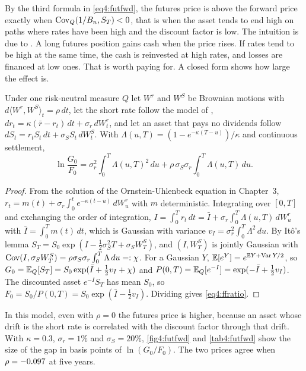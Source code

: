\begin{chapterrefs}
By the third formula in \cref{eq4:futfwd}, the futures price is above the forward price exactly when
$\operatorname{Cov}_Q(1/B_n,S_T)<0$, that is when the asset tends to end high on paths where rates have been high and
the discount factor is low. The intuition is due to \textcite{cox1981}. A long futures position gains
cash when the price rises. If rates tend to be high at the same time, the cash is reinvested at high
rates, and losses are financed at low ones. That is worth paying for. A closed form shows how large
the effect is.

\begin{proposition}\label{prop4:vasicek}
Under one risk-neutral measure $Q$ let $W^r$ and $W^S$ be Brownian motions with
$d\langle W^r,W^S\rangle_t=\rho\,dt$, let the short rate follow the model of \textcite{vasicek1977},
$dr_t=\kappa(\bar r-r_t)\,dt+\sigma_r\,dW^r_t$, and let an asset that pays no dividends follow
$dS_t=r_tS_t\,dt+\sigma_SS_t\,dW^S_t$. With $\Lambda(u,T)=(1-e^{-\kappa(T-u)})/\kappa$ and continuous
settlement,
\begin{equation}\label{eq4:ffratio}
  \ln\frac{G_0}{F_0}=\sigma_r^2\int_0^T\Lambda(u,T)^2\,du+\rho\,\sigma_S\sigma_r\int_0^T\Lambda(u,T)\,du .
\end{equation}
\end{proposition}

\begin{proof}
From the solution of the Ornstein-Uhlenbeck equation in Chapter~3,
$r_t=m(t)+\sigma_r\int_0^te^{-\kappa(t-u)}\,dW^r_u$ with $m$ deterministic. Integrating over
$[0,T]$ and exchanging the order of integration,
$I=\int_0^Tr_t\,dt=\bar I+\sigma_r\int_0^T\Lambda(u,T)\,dW^r_u$ with $\bar I=\int_0^Tm(t)\,dt$, which is
Gaussian with variance $v_I=\sigma_r^2\int_0^T\Lambda^2\,du$. By It\^o's lemma
$S_T=S_0\exp(I-\tfrac12\sigma_S^2T+\sigma_SW^S_T)$, and $(I,W^S_T)$ is jointly Gaussian with
$\operatorname{Cov}(I,\sigma_SW^S_T)=\rho\sigma_S\sigma_r\int_0^T\Lambda\,du=:\chi$. For a Gaussian $Y$,
$\mathbb{E}[e^Y]=e^{\mathbb{E} Y+\operatorname{Var} Y/2}$, so $G_0=\mathbb{E}_Q[S_T]=S_0\exp(\bar I+\tfrac12v_I+\chi)$ and
$P(0,T)=\mathbb{E}_Q[e^{-I}]=\exp(-\bar I+\tfrac12v_I)$. The discounted asset $e^{-I}S_T$ has mean $S_0$,
so $F_0=S_0/P(0,T)=S_0\exp(\bar I-\tfrac12v_I)$. Dividing gives \cref{eq4:ffratio}.
\end{proof}

In this model, even with $\rho=0$ the futures price is higher, because an asset whose drift is the
short rate is correlated with the discount factor through that drift. With $\kappa=0.3$,
$\sigma_r=1\%$ and $\sigma_S=20\%$, \cref{fig4:futfwd} and \cref{tab4:futfwd} show the size of the
gap in basis points of $\ln(G_0/F_0)$. The two prices agree when $\rho=-0.097$ at five years.


\end{chapterrefs}
